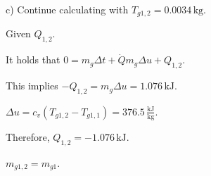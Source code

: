 c) Continue calculating with \( T_{g1,2} = 0.0034 \, \text{kg} \).

Given \( Q_{1,2} \).

It holds that \( 0 = m_g \Delta t + \dot{Q} m_g \Delta u + Q_{1,2} \).

This implies \( -Q_{1,2} = m_g \Delta u = 1.076 \, \text{kJ} \).

\( \Delta u = c_v (T_{g1,2} - T_{g1,1}) = 376.5 \, \frac{\text{kJ}}{\text{kg}} \).

Therefore, \( Q_{1,2} = -1.076 \, \text{kJ} \).

\( m_{g1,2} = m_{g1} \).